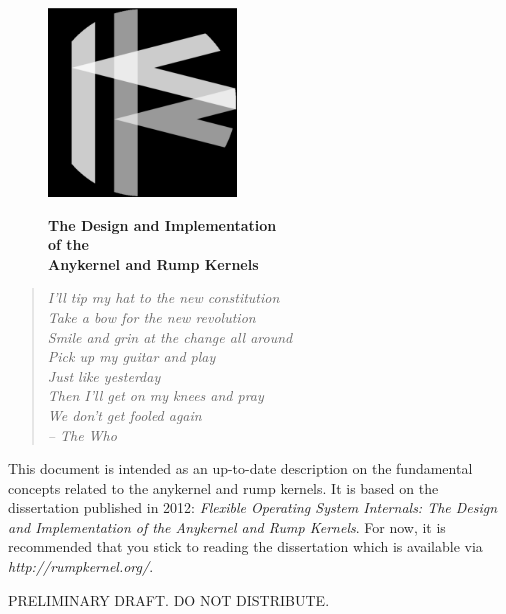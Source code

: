 \documentclass[openright]{tkkdiss}
\begin{document}
\thispagestyle{empty}

\pagecolor{blue}\afterpage{\nopagecolor}
\begin{figure}[t]
\includegraphics[width=5cm]{logo.pdf}

{\color{white} \fontsize{50}{50}\bfseries The Design and Implementation\\
of the\\
Anykernel and Rump Kernels\\
}
\end{figure}

\begin{preface}
\pagecolor{white}

\begin{verse}
\textit{I'll tip my hat to the new constitution\\
Take a bow for the new revolution\\
Smile and grin at the change all around\\
Pick up my guitar and play\\
Just like yesterday\\
Then I'll get on my knees and pray\\
We don't get fooled again\\
-- The Who}
\end{verse}

This document is intended as an up-to-date description on the fundamental
concepts related to the anykernel and rump kernels.  It is based on
the dissertation published in 2012: \textit{Flexible Operating System
Internals: The Design and Implementation of the Anykernel and Rump
Kernels}.  For now, it is recommended that you stick to reading the
dissertation which is available via \textit{http://rumpkernel.org/}.

{\large PRELIMINARY DRAFT.  DO NOT DISTRIBUTE.}

\end{preface}


\tableofcontents


\begin{listofabbreviations}

\printnomenclature[5cm]

\end{listofabbreviations}


\listoffigures
\listoftables







\end{document}
